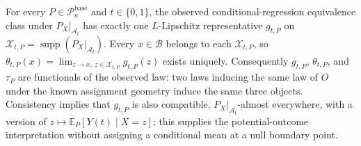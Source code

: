 For every \(P\in\mathcal P_{\kappa}^{\mathrm{base}}\) and \(t\in\{0,1\}\), the observed conditional-regression equivalence class under \(P_X|_{\mathcal A_t}\) has exactly one \(L\)-Lipschitz representative \(g_{t,P}\) on \(\mathcal X_{t,P}=\operatorname{supp}(P_X|_{\mathcal A_t})\). Every \(x\in\mathcal B\) belongs to each \(\mathcal X_{t,P}\), so \(\theta_{t,P}(x)=\lim_{z\to x,\ z\in\mathcal X_{t,P}}g_{t,P}(z)\) exists uniquely. Consequently \(g_{t,P}\), \(\theta_{t,P}\), and \(\tau_P\) are functionals of the observed law: two laws inducing the same law of \(O\) under the known assignment geometry induce the same three objects. Consistency implies that \(g_{t,P}\) is also compatible, \(P_X|_{\mathcal A_t}\)-almost everywhere, with a version of \(z\mapsto\mathbb E_P[Y(t)\mid X=z]\); this supplies the potential-outcome interpretation without assigning a conditional mean at a null boundary point.